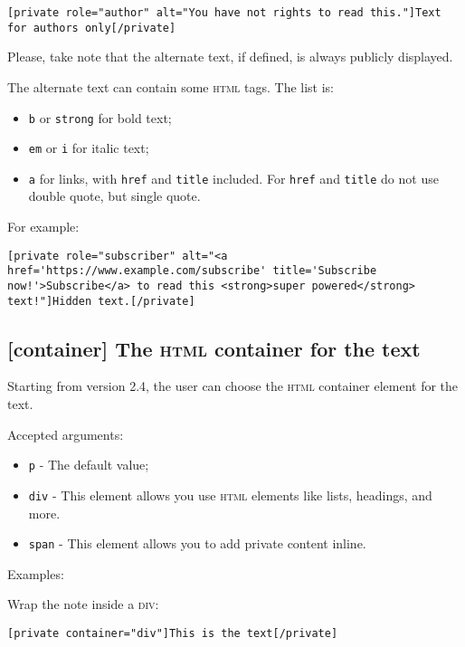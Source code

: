 \documentclass[a4paper,11pt]{article}
\begin{document}
\begin{lstlisting}
[private role="author" alt="You have not rights to read this."]Text for authors only[/private]
\end{lstlisting}

Please, take note that the alternate text, if defined, is always publicly displayed.

The alternate text can contain some \textsc{html} tags. The list is:

\begin{itemize}
 \item \verb+b+ or \verb+strong+ for bold text;
 \item \verb+em+ or \verb+i+ for italic text;
 \item \verb+a+ for links, with \verb+href+ and \verb+title+ included. For \verb+href+ and \verb+title+ do not use double quote, but single quote.
\end{itemize}

For example:

\begin{lstlisting}
[private role="subscriber" alt="<a href='https://www.example.com/subscribe' title='Subscribe now!'>Subscribe</a> to read this <strong>super powered</strong> text!"]Hidden text.[/private]
\end{lstlisting}

\subsection{[container] The \textsc{html} container for the text}

Starting from version 2.4, the user can choose the \textsc{html} container element for the text.

Accepted arguments:

\begin{itemize}
 \item \verb+p+ - The default value;
 \item \verb+div+ - This element allows you use \textsc{html} elements like lists, headings, and more.
 \item \verb+span+ - This element allows you to add private content inline.
\end{itemize}

Examples:

Wrap the note inside a \textsc{div}:

\begin{lstlisting}
[private container="div"]This is the text[/private]
\end{lstlisting}
\end{document}
